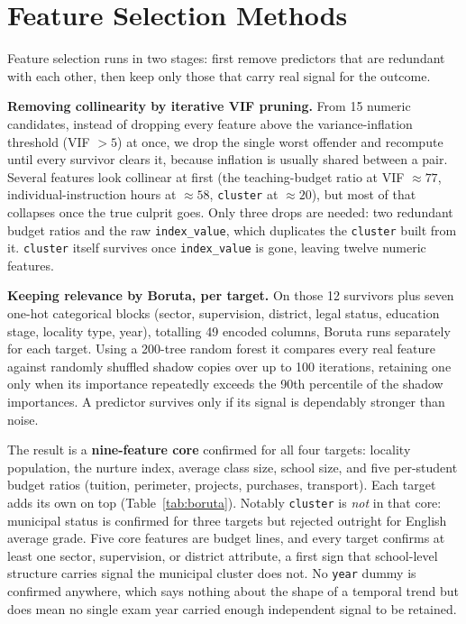 \section{Feature Selection Methods}
\label{sec:features}

Feature selection runs in two stages: first remove predictors that are redundant
with each other, then keep only those that carry real signal for the outcome.

\textbf{Removing collinearity by iterative VIF pruning.} From 15 numeric
candidates, instead of dropping every feature above the variance-inflation
threshold (VIF $>5$) at once, we drop the single worst offender and recompute
until every survivor clears it, because inflation is usually shared between a
pair. Several features look collinear at first (the teaching-budget ratio at
VIF $\approx 77$, individual-instruction hours at $\approx 58$, \texttt{cluster}
at $\approx 20$), but most of that collapses once the true culprit goes. Only
three drops are needed: two redundant budget ratios and the raw
\texttt{index\_value}, which duplicates the \texttt{cluster} built from it.
\texttt{cluster} itself survives once \texttt{index\_value} is gone, leaving
twelve numeric features.

\textbf{Keeping relevance by Boruta, per target.} On those 12 survivors plus
seven one-hot categorical blocks (sector, supervision, district, legal status,
education stage, locality type, year), totalling 49 encoded columns, Boruta runs
separately for each target. Using a 200-tree random forest it compares every real feature
against randomly shuffled shadow copies over up to 100 iterations, retaining one
only when its importance repeatedly exceeds the 90th percentile of the shadow
importances. A predictor survives only if its signal is dependably stronger than
noise.

The result is a \textbf{nine-feature core} confirmed for all four targets:
locality population, the nurture index, average class size, school size, and five
per-student budget ratios (tuition, perimeter, projects, purchases, transport).
Each target adds its own on top (Table~\ref{tab:boruta}). Notably
\texttt{cluster} is \emph{not} in that core: municipal status is confirmed for
three targets but rejected outright for English average grade. Five core features
are budget lines, and every target confirms at least one sector, supervision, or
district attribute, a first sign that school-level structure carries signal the
municipal cluster does not. No \texttt{year} dummy is confirmed anywhere, which
says nothing about the shape of a temporal trend but does mean no single exam
year carried enough independent signal to be retained.

